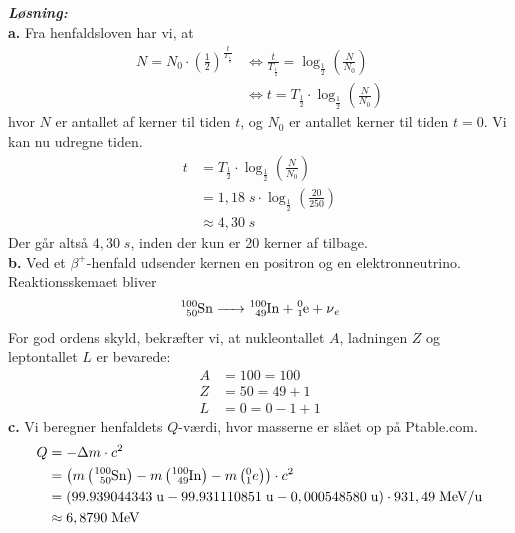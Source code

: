 \documentclass{report}
\newcommand{\sol}{\setlength{\parindent}{0cm}\textbf{\textit{Løsning:}}\setlength{\parindent}{1cm}}
\begin{document}
\sol \\
\textbf{a.}
Fra henfaldsloven har vi, at 
\begin{equation*}
\begin{split}
  N=N_0 \cdot \left(\frac{1}{2}\right) ^{\frac{t}{T _{\frac{1}{2}}}} &\iff \frac{t}{T _{\frac{1}{2}}}=\log_{\frac{1}{2}}\left(\frac{N}{N_0}\right) \\
  &\iff t=T _{\frac{1}{2}} \cdot \log_{\frac{1}{2}}\left(\frac{N}{N_0}\right)
\end{split}
\end{equation*}
hvor $N$ er antallet af kerner til tiden $t$, og $N_0$ er antallet kerner til tiden $t=0$. 
Vi kan nu udregne tiden.
\begin{equation*}
\begin{split}
  t&=T _{\frac{1}{2}} \cdot \log_{\frac{1}{2}}\left(\frac{N}{N_0}\right)\\
  &=1,18 \;\unit{s} \cdot \log_{\frac{1}{2}}\left(\frac{20}{250}\right) \\
  &\approx 4,30 \;\unit{s} 
\end{split}
\end{equation*}
Der går altså $4,30 \;\unit{s} $, inden der kun er 20 kerner af  tilbage. \\[1ex]
\textbf{b.}
Ved et $\beta ^+$-henfald udsender kernen en positron og en elektronneutrino.
Reaktionsskemaet bliver 
\[
\ce{_50^100Sn -> ^100_49In + ^0_1e + \nu_e} 
\] 
For god ordens skyld, bekræfter vi, at nukleontallet $A$, ladningen $Z$ og leptontallet $L$ er bevarede:
\begin{equation*}
\begin{split}
  A&=100=100\\
  Z&=50=49+1\\
  L&=0=0-1+1
\end{split}
\end{equation*}
\textbf{c.}
Vi beregner henfaldets $Q$-værdi, hvor masserne er slået op på Ptable.com.
\begin{equation*}
\begin{split}
  Q&=-\Delta m \cdot c^2\\
  &=\left( m\left(\ce{_50^100Sn} \right) - m\left(\ce{^100_49In} \right)- m \left(^0_1e\right) \right) \cdot c^2\\
  &=\left(99.939044343 \;\unit{u} - 99.931110851 \;\unit{u} - 0,000548580 \;\unit{u} \right) \cdot 931,49 \;\unit{MeV/u} \\
  &\approx 6,8790 \;\unit{MeV} 
\end{split}
\end{equation*}
\end{document}
